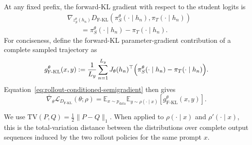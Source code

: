 \documentclass{article} %
\theoremstyle{plain}
\theoremstyle{definition}
\theoremstyle{remark}
\begin{document}
At any fixed prefix, the forward-KL gradient with respect to the student
logits is
\begin{align}
    &\nabla_{z_S^\theta(h_n)}
    D_{\mathrm{F\text{-}KL}}\left(
        \pi_S^\theta(\cdot\mid h_n),
        \pi_T(\cdot\mid h_n)
    \right)\nonumber\\
    &\qquad=
    \pi_S^\theta(\cdot\mid h_n)
    -\pi_T(\cdot\mid h_n).
    \label{eq:forward-kl-logit-gradient}
\end{align}
For conciseness, define the forward-KL parameter-gradient contribution of a
complete sampled trajectory as
\begin{align}
    g_{\mathrm{F\text{-}KL}}^\theta(x,y)
    :=\frac{1}{L_y}\sum_{n=1}^{L_y}
    J_\theta(h_n)^\top
    \Bigl(
        \pi_S^\theta(\cdot\mid h_n)
        -\pi_T(\cdot\mid h_n)
    \Bigr).
    \label{eq:forward-trajectory-gradient}
\end{align}
Equation~\ref{eq:rollout-conditioned-semigradient} then gives
\begin{equation}
    \bar\nabla_\theta
    \mathcal L_{D_{\mathrm{F\text{-}KL}}}(\theta;\rho)
    =
    \mathbb E_{x\sim p_{\mathrm{data}}}
    \mathbb E_{y\sim\rho(\cdot\mid x)}
    \left[g_{\mathrm{F\text{-}KL}}^\theta(x,y)\right].
    \label{eq:forward-semigradient-trajectory-form}
\end{equation}

We use
$\mathrm{TV}(P,Q)=\tfrac12\lVert P-Q\rVert_1$.  When applied to
$\rho(\cdot\mid x)$ and $\rho'(\cdot\mid x)$, this is the total-variation
distance between the distributions over complete output sequences induced by
the two rollout policies for the same prompt $x$.
\end{document}
